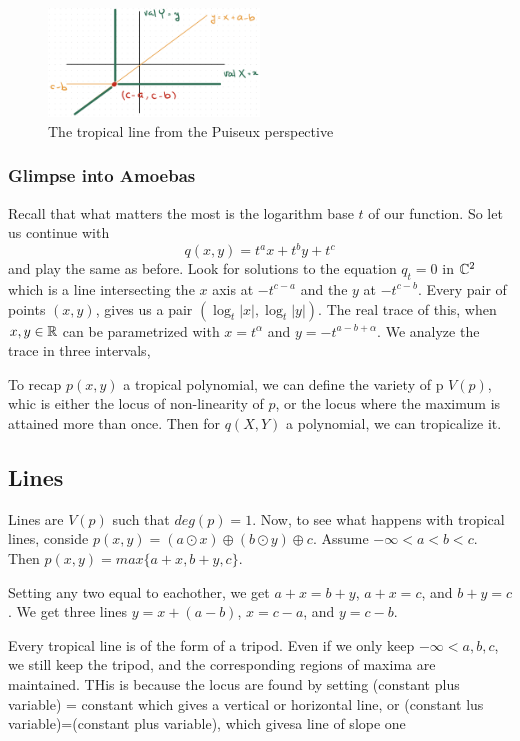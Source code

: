 \documentclass[12pt]{memoir}
\theoremstyle{definition}
\def\al{\alpha}
\begin{document}
\begin{figure}[h!]
    \centering
    \includegraphics[width=0.5\textwidth]{figs/fig7-2-TropicalLinePuiseuxExample.png}
    \caption{The tropical line from the Puiseux perspective}
    \label{fig:7.2-TropicalLinePuiseuxExample}
\end{figure}

\subsubsection{Glimpse into Amoebas}

Recall that what matters the most is the logarithm base $t$ of our function. So let us continue with 
$$q(x,y)=t^ax+t^by+t^c$$
and play the same as before. Look for solutions to the equation $q_t=0$ in $\mathbb{C}^2$ which is a line intersecting the $x$ axis at $-t^{c-a}$ and the $y$ at $-t^{c-b}$. Every pair of points $(x,y)$, gives us a pair $(\log_t|x|,\log_t|y|)$. The real trace of this, when $x,y\in\mathbb{R}$ can be parametrized with $x=t^\al$ and $y=-t^{a-b+\al}$. We analyze the trace in three intervals, 



To recap $p(x,y)$ a tropical polynomial, we can define the variety of p $V(p)$, whic is either the locus of non-linearity of $p$, or the locus where the maximum is attained more than once. Then for $q(X,Y)$ a polynomial, we can tropicalize it.




\subsection{Lines}
Lines are $V(p)$ such that $deg(p)=1$.
Now, to see what happens with tropical lines, conside $p(x,y) = (a \odot x) \oplus (b \odot y) \oplus c$. Assume $-\infty<a<b<c$. Then $p(x,y) = max\{ a+x,b+y,c\}$.

Setting any two equal to eachother, we get $a+x=b+y$, $a+x=c$, and $b+y=c$. We get three lines $y=x+(a-b)$, $x=c-a$, and $y=c-b$.

Every tropical line is of the form of a tripod. Even if we only keep $-\infty< a,b,c$, we still keep the tripod, and the corresponding regions of maxima are maintained. THis is because the locus are found by setting (constant plus variable) = constant which gives a vertical or horizontal line, or (constant lus variable)=(constant plus variable), which givesa  line of slope one
\end{document}
